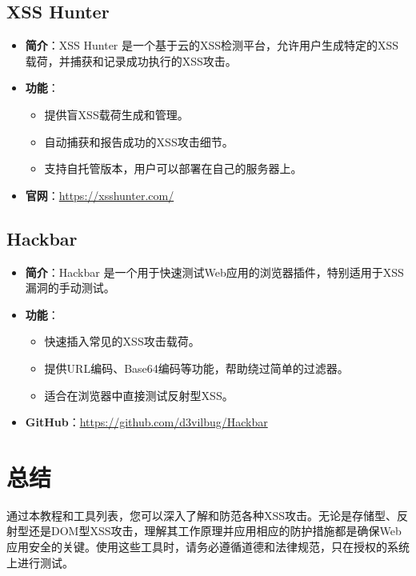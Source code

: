 \documentclass{article}
\begin{document}
\subsection{XSS Hunter}
\begin{itemize}
\item \textbf{简介}：XSS Hunter 是一个基于云的XSS检测平台，允许用户生成特定的XSS载荷，并捕获和记录成功执行的XSS攻击。
\item \textbf{功能}：
\begin{itemize}
\item 提供盲XSS载荷生成和管理。
\item 自动捕获和报告成功的XSS攻击细节。
\item 支持自托管版本，用户可以部署在自己的服务器上。
\end{itemize}
\item \textbf{官网}：\url{https://xsshunter.com/}
\end{itemize}

\subsection{Hackbar}
\begin{itemize}
\item \textbf{简介}：Hackbar 是一个用于快速测试Web应用的浏览器插件，特别适用于XSS漏洞的手动测试。
\item \textbf{功能}：
\begin{itemize}
\item 快速插入常见的XSS攻击载荷。
\item 提供URL编码、Base64编码等功能，帮助绕过简单的过滤器。
\item 适合在浏览器中直接测试反射型XSS。
\end{itemize}
\item \textbf{GitHub}：\url{https://github.com/d3vilbug/Hackbar}
\end{itemize}

\section{总结}

通过本教程和工具列表，您可以深入了解和防范各种XSS攻击。无论是存储型、反射型还是DOM型XSS攻击，理解其工作原理并应用相应的防护措施都是确保Web应用安全的关键。使用这些工具时，请务必遵循道德和法律规范，只在授权的系统上进行测试。
\end{document}
